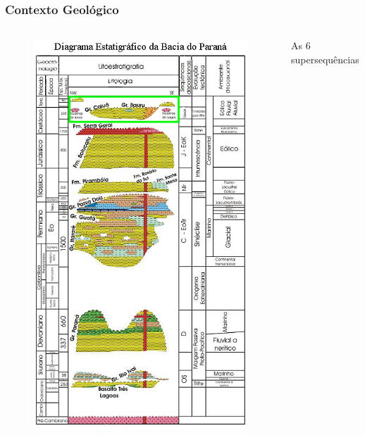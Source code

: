 \documentclass[aspectratio=10]{beamer} %
\begin{document}
\begin{frame}
\begin{columns}
\begin{column}{0.55\textwidth}
\end{column}


\end{columns}
\end{frame}	

\begin{frame}
\frametitle{Contexto Geológico}
\begin{columns}
\begin{column}{0.4\textwidth}
\begin{figure}
\includegraphics[scale=0.36]{Imagens/diagramabauru.png}
\end{figure}
\end{column}
\begin{column}{0.55\textwidth}
\begin{block}{As $6$ supersequências}

\end{block}
\end{column}
\end{columns}
\end{frame}
\end{document}
